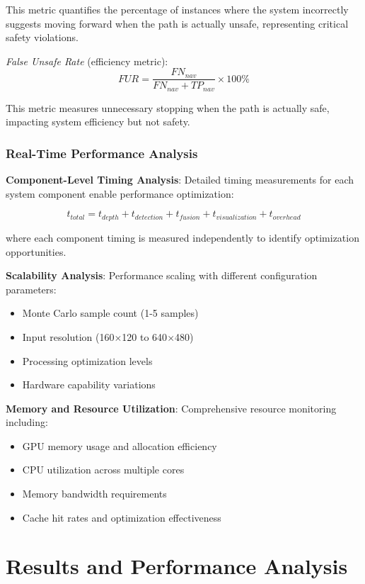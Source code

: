 \documentclass[10pt]{article}
\begin{document}
This metric quantifies the percentage of instances where the system incorrectly suggests moving forward when the path is actually unsafe, representing critical safety violations.

\textit{False Unsafe Rate} (efficiency metric):
\begin{equation}
FUR = \frac{FN_{nav}}{FN_{nav} + TP_{nav}} \times 100\%
\end{equation}

This metric measures unnecessary stopping when the path is actually safe, impacting system efficiency but not safety.

\subsubsection{Real-Time Performance Analysis}

\textbf{Component-Level Timing Analysis}:
Detailed timing measurements for each system component enable performance optimization:

\begin{equation}
t_{total} = t_{depth} + t_{detection} + t_{fusion} + t_{visualization} + t_{overhead}
\end{equation}

where each component timing is measured independently to identify optimization opportunities.

\textbf{Scalability Analysis}:
Performance scaling with different configuration parameters:
\begin{itemize}
\item Monte Carlo sample count (1-5 samples)
\item Input resolution (160$\times$120 to 640$\times$480)
\item Processing optimization levels
\item Hardware capability variations
\end{itemize}

\textbf{Memory and Resource Utilization}:
Comprehensive resource monitoring including:
\begin{itemize}
\item GPU memory usage and allocation efficiency
\item CPU utilization across multiple cores
\item Memory bandwidth requirements
\item Cache hit rates and optimization effectiveness
\end{itemize}

\section{Results and Performance Analysis}
\end{document}
